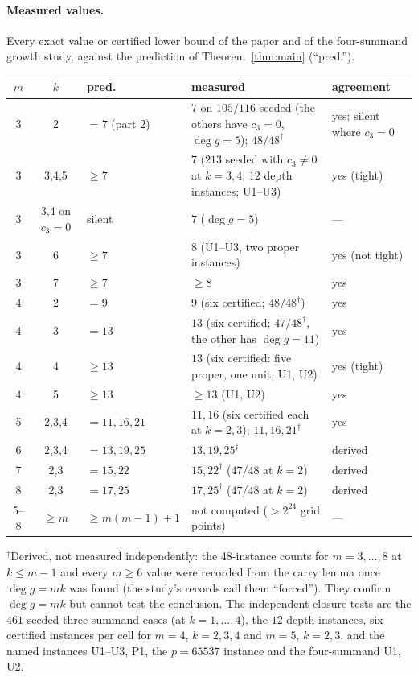 \documentclass[11pt]{article}
\theoremstyle{definition}
\theoremstyle{remark}
\begin{document}
\paragraph{Measured values.} Every exact value or certified lower bound of
the paper and of the four-summand growth study, against the
prediction of Theorem~\ref{thm:main} (``pred.'').
\begin{center}\small
\begin{tabular}{ccp{2.1cm}p{6.0cm}p{2.6cm}}
\toprule
$m$ & $k$ & pred. & measured & agreement\\
\midrule
3 & 2 & $=7$ (part 2) & $7$ on $105/116$ seeded (the others have $c_3=0$, $\deg g=5$); $48/48^\dagger$ & yes; silent where $c_3=0$\\
3 & 3,4,5 & $\ge7$ & $7$ ($213$ seeded with $c_3\ne0$ at $k=3,4$; $12$ depth instances; U1--U3) & yes (tight)\\
3 & 3,4 on $c_3=0$ & silent & $7$ ($\deg g=5$) & ---\\
3 & 6 & $\ge7$ & $8$ (U1--U3, two proper instances) & yes (not tight)\\
3 & 7 & $\ge7$ & $\ge8$ & yes\\
4 & 2 & $=9$ & $9$ (six certified; $48/48^\dagger$) & yes\\
4 & 3 & $=13$ & $13$ (six certified; $47/48^\dagger$, the other has $\deg g=11$) & yes\\
4 & 4 & $\ge13$ & $13$ (six certified: five proper, one unit; U1, U2) & yes (tight)\\
4 & 5 & $\ge13$ & $\ge13$ (U1, U2) & yes\\
5 & 2,3,4 & $=11,16,21$ & $11,16$ (six certified each at $k=2,3$); $11,16,21^\dagger$ & yes\\
6 & 2,3,4 & $=13,19,25$ & $13,19,25^\dagger$ & derived\\
7 & 2,3 & $=15,22$ & $15,22^\dagger$ ($47/48$ at $k=2$) & derived\\
8 & 2,3 & $=17,25$ & $17,25^\dagger$ ($47/48$ at $k=2$) & derived\\
5--8 & $\ge m$ & $\ge m(m-1)+1$ & not computed ($>2^{24}$ grid points) & ---\\
\bottomrule
\end{tabular}
\end{center}
$^\dagger$Derived, not measured independently: the 48-instance counts for
$m=3,\ldots,8$ at $k\le m-1$ and every $m\ge6$ value were recorded from the
carry lemma once $\deg g=mk$ was found (the study's records call them
``forced''). They confirm $\deg g=mk$ but cannot test the conclusion. The
independent closure tests are the $461$ seeded three-summand cases (at
$k=1,\ldots,4$), the $12$ depth instances, six certified instances per cell for
$m=4$, $k=2,3,4$ and $m=5$, $k=2,3$, and the named instances U1--U3, P1, the
$p=65537$ instance and the four-summand U1, U2.
\end{document}
